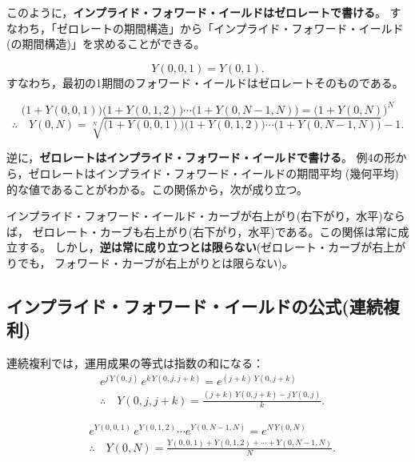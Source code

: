 このように，\textbf{インプライド・フォワード・イールドはゼロレートで書ける}。
すなわち，「ゼロレートの期間構造」から「インプライド・フォワード・イールド
(の期間構造)」を求めることができる。

\begin{example}[例3:1年間の投資]
\[
Y(0,0,1) = Y(0,1).
\]
すなわち，最初の1期間のフォワード・イールドはゼロレートそのものである。
\end{example}

\begin{example}[例4:$N$ 年間の投資]
\[
\bigl(1+Y(0,0,1)\bigr)\bigl(1+Y(0,1,2)\bigr)\cdots\bigl(1+Y(0,N-1,N)\bigr)
= \bigl(1+Y(0,N)\bigr)^{N}
\]
\[
\therefore\quad
Y(0,N) = \sqrt[N]{\bigl(1+Y(0,0,1)\bigr)\bigl(1+Y(0,1,2)\bigr)\cdots
\bigl(1+Y(0,N-1,N)\bigr)} - 1.
\]
\end{example}

逆に，\textbf{ゼロレートはインプライド・フォワード・イールドで書ける}。
例4の形から，ゼロレートはインプライド・フォワード・イールドの期間平均
(幾何平均)的な値であることがわかる。この関係から，次が成り立つ。

\begin{keypoint}[カーブの形状の関係]
インプライド・フォワード・イールド・カーブが右上がり(右下がり，水平)ならば，
ゼロレート・カーブも右上がり(右下がり，水平)である。この関係は常に成立する。
しかし，\textbf{逆は常に成り立つとは限らない}(ゼロレート・カーブが右上がりでも，
フォワード・カーブが右上がりとは限らない)。
\end{keypoint}

\subsection{インプライド・フォワード・イールドの公式(連続複利)}

\begin{example}
連続複利では，運用成果の等式は指数の和になる：
\begin{align*}
&e^{j\,Y(0,j)}\,e^{k\,Y(0,j,j+k)} = e^{(j+k)\,Y(0,j+k)}\\
&\therefore\quad
Y(0,j,j+k) = \frac{(j+k)\,Y(0,j+k) - j\,Y(0,j)}{k}.
\end{align*}
\end{example}

\begin{example}[例2:$N$ 年間の投資]
\begin{align*}
&e^{Y(0,0,1)}\,e^{Y(0,1,2)}\cdots e^{Y(0,N-1,N)} = e^{N\,Y(0,N)}\\
&\therefore\quad
Y(0,N) = \frac{Y(0,0,1) + Y(0,1,2) + \cdots + Y(0,N-1,N)}{N}.
\end{align*}
\end{example}

